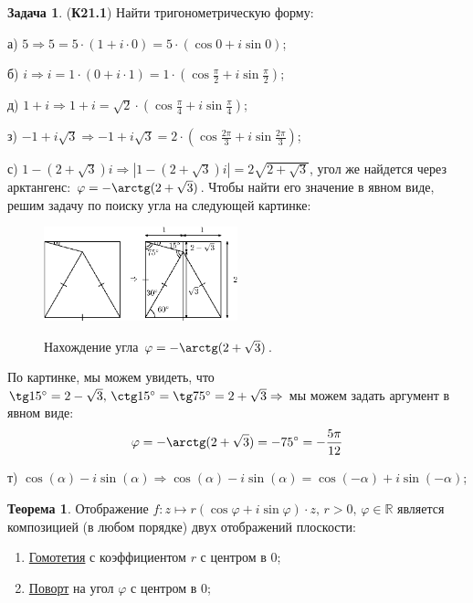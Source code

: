\documentclass[12pt]{article}
\newcommand{\MR}{\mathbb{R}}
\theoremstyle{definition}
\newtheorem{problem}{Задача}
\newtheorem{theorem}{Теорема}
\begin{document}
\begin{problem}(\textbf{К21.1})
	Найти тригонометрическую форму:
	
	а) $5 \Rightarrow 5 = 5{\cdot}(1 + i{\cdot}0) = 5{\cdot}(\cos0 + i\sin0)$;
	
	б) $i \Rightarrow i = 1{\cdot}(0 + i{\cdot}1) = 1{\cdot}\left(\cos\tfrac{\pi}{2} + i\sin{\tfrac{\pi}{2}}\right)$;
	
	д) $1 + i \Rightarrow 1 + i = \sqrt{2}{\cdot}\left(\cos\tfrac{\pi}{4} + i \sin\tfrac{\pi}{4}\right)$;
	
	з) $-1 + i\sqrt{3} \Rightarrow -1 + i\sqrt{3} = 2{\cdot}\left(\cos\tfrac{2\pi}{3} + i \sin\tfrac{2\pi}{3}\right)$;
	
	с) $1 - (2 + \sqrt{3})i \Rightarrow |1 - (2 + \sqrt{3})i| =  2\sqrt{2 + \sqrt{3}}$, угол же найдется через арктангенс: $\varphi = -\arctg(2 + \sqrt{3})$. Чтобы найти его значение в явном виде, решим задачу по поиску угла на следующей картинке:
	\begin{figure}[H]
		\centering
		\includegraphics[width=0.5\textwidth]{AL1S2_10.eps}
		\label{2_10}
		\caption{Нахождение угла $\varphi = -\arctg(2 + \sqrt{3})$.}
	\end{figure}
	По картинке, мы можем увидеть, что $\tg15^{\circ} = 2 - \sqrt{3}, \, \ctg15^{\circ} = \tg75^{\circ} = 2 + \sqrt{3} \Rightarrow$ мы можем задать аргумент в явном виде:
	$$
		\varphi = -\arctg(2 + \sqrt{3}) = -75^{\circ} = -\dfrac{5\pi}{12}
	$$ 
	
	т) $\cos(\alpha) - i\sin(\alpha) \Rightarrow \cos(\alpha) - i\sin(\alpha) = \cos(-\alpha) + i\sin(-\alpha)$;
\end{problem}
\newpage
\begin{theorem}
	Отображение $f\colon z \mapsto r(\cos\varphi + i\sin\varphi){\cdot}z, \, r > 0, \, \varphi \in \MR$ является композицией (в любом порядке) двух отображений плоскости:
	\begin{enumerate}[label=\arabic*)]
		\item \uline{Гомотетия} с коэффициентом $r$ с центром в $0$;
		\item \uline{Поворт} на угол $\varphi$ с центром в $0$;
 	\end{enumerate}
\end{theorem}
\end{document}
